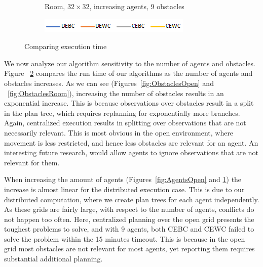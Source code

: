 \documentclass[letterpaper]{article} %
\begin{document}
\begin{figure}[t]
\begin{subfigure}[b]{0.2\textwidth}
      \caption{Room, $32\times 32$, increasing agents, 9 obstacles}
      \label{fig:AgentsRoom}
    \end{subfigure}
        \begin{subfigure}[b]{0.24\textwidth}
      \includegraphics[scale=.5]{Figures/LegendHorizontal.png}
    \end{subfigure}
    \caption{Comparing execution time}
    \label{fig:32}
\end{figure}

We now analyze our algorithm sensitivity to the number of agents and obstacles.
Figure ~\ref{fig:32} compares the run time of our algorithms as the number of agents and obstacles increases. As we can see (Figures~\ref{fig:ObstaclesOpen} and ~\ref{fig:ObstaclesRoom}), increasing the number of obstacles results in an exponential increase. This is because observations over obstacles result in a split in the plan tree, which requires replanning for exponentially more branches. Again, centralized execution results in splitting over observations that are not necessarily relevant. This is most obvious in the open environment, where movement is less restricted, and hence less obstacles are relevant for an agent.  An interesting future research, would allow agents to ignore observations that are not relevant for them.

When increasing the amount of agents (Figures~\ref{fig:AgentsOpen} and \ref{fig:AgentsRoom}) the increase is almost linear for the distributed execution case. This is due to our distributed computation, where we create plan trees for each agent independently. As these grids are fairly large, with respect to the number of agents, conflicts do not happen too often. Here, centralized planning over the open grid presents the toughest problems to solve, and with 9 agents, both CEBC and CEWC failed to solve the problem within the 15 minutes timeout. This is because in the open grid most obstacles are not relevant for most agents, yet reporting them requires substantial additional planning.
\end{document}

